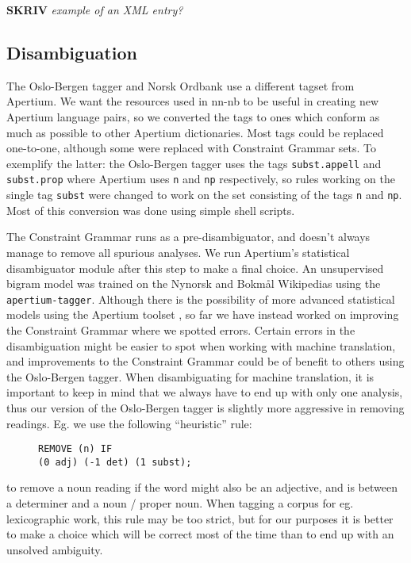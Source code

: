 \documentclass[11pt]{article}
\newcommand{\comment}[1]{\textbf{SKRIV} {\it #1}}
\begin{document}
\comment{ example of an XML entry?\\}


\subsection{Disambiguation}

The Oslo-Bergen tagger and Norsk Ordbank use a different tagset from
Apertium. We want the resources used in nn-nb to be useful in creating
new Apertium language pairs, so we converted the tags to ones which
conform as much as possible to other Apertium dictionaries. Most tags
could be replaced one-to-one, although some were replaced with
Constraint Grammar sets. To exemplify the latter: the Oslo-Bergen
tagger uses the tags {\tt subst.appell} and
{\tt subst.prop} where Apertium uses {\tt n} and
{\tt np} respectively, so rules working on the single tag
{\tt subst} were changed to work on the set consisting of the
tags {\tt n} and {\tt np}. Most of this conversion was done
using simple shell scripts.

The Constraint Grammar runs as a pre-disambiguator, and doesn't always
manage to remove all spurious analyses. We run Apertium's statistical
disambiguator module after this step to make a final choice. An
unsupervised bigram model was trained on the Nynorsk and Bokmål
Wikipedias using the {\tt apertium-tagger}. Although there is the
possibility of more advanced statistical models using the Apertium
toolset \citep[see~eg.~][]{sanchez2008utl,sheikh2009trigram}, so far
we have instead worked on improving the Constraint Grammar where we
spotted errors. Certain errors in the disambiguation might be easier
to spot when working with machine translation, and improvements to the
Constraint Grammar could be of benefit to others using the Oslo-Bergen
tagger. When disambiguating for machine translation, it is important
to keep in mind that we always have to end up with only one analysis,
thus our version of the Oslo-Bergen tagger is slightly more aggressive
in removing readings. Eg. we use the following ``heuristic'' rule:

\begin{figure}[htp] {\tt REMOVE (n) IF\\
    (0 adj) (-1 det) (1 subst);}
\end{figure}

to remove a noun reading if the word might also be an adjective,
and is between a determiner and a noun / proper noun. When tagging a
corpus for eg. lexicographic work, this rule may be too strict, but
for our purposes it is better to make a choice which will be correct
most of the time than to end up with an unsolved ambiguity.
\end{document}
